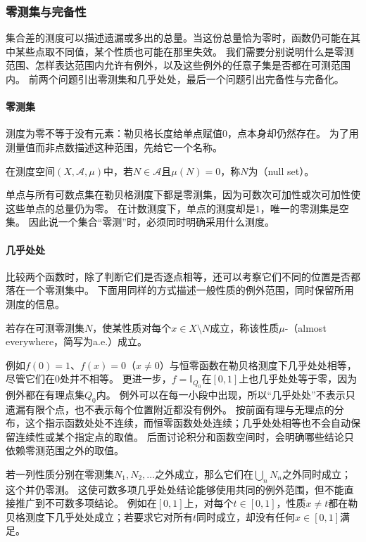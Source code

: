 \subsubsection{零测集与完备性}
\label{sec:comb-null-sets-and-completion}

集合差的测度可以描述遗漏或多出的总量。当这份总量恰为零时，函数仍可能在其中某些点取不同值，某个性质也可能在那里失效。
我们需要分别说明什么是零测范围、怎样表达范围内允许有例外，以及这些例外的任意子集是否都在可测范围内。
前两个问题引出零测集和几乎处处，最后一个问题引出完备性与完备化。

\paragraph{零测集}

测度为零不等于没有元素：勒贝格长度给单点赋值$0$，点本身却仍然存在。
为了用测量值而非点数描述这种范围，先给它一个名称。
\begin{definition}[零测集]
\label{def:analysis-null-set-almost-everywhere}
在测度空间$(X,\mathcal A,\mu)$中，若$N\in\mathcal A$且$\mu(N)=0$，称$N$为（null set）。
\end{definition}
单点与所有可数点集在勒贝格测度下都是零测集，因为可数次可加性或次可加性使这些单点的总量仍为零。
在计数测度下，单点的测度却是$1$，唯一的零测集是空集。
因此说一个集合“零测”时，必须同时明确采用什么测度。

\paragraph{几乎处处}

比较两个函数时，除了判断它们是否逐点相等，还可以考察它们不同的位置是否都落在一个零测集中。
下面用同样的方式描述一般性质的例外范围，同时保留所用测度的信息。
\begin{definition}[几乎处处]
若存在可测零测集$N$，使某性质对每个$x\in X\setminus N$成立，称该性质$\mu$-（almost everywhere，简写为a.e.）成立。
\end{definition}
例如$f(0)=1$、$f(x)=0$（$x\neq0$）与恒零函数在勒贝格测度下几乎处处相等，尽管它们在$0$处并不相等。
更进一步，$f=\mathbb I_{Q_0}$在$[0,1]$上也几乎处处等于零，因为例外都在有理点集$Q_0$内。
例外可以在每一小段中出现，所以“几乎处处”不表示只遗漏有限个点，也不表示每个位置附近都没有例外。
按前面有理与无理点的分布，这个指示函数处处不连续，而恒零函数处处连续；几乎处处相等也不会自动保留连续性或某个指定点的取值。
后面讨论积分和函数空间时，会明确哪些结论只依赖零测范围之外的取值。

若一列性质分别在零测集$N_1,N_2,\ldots$之外成立，那么它们在$\bigcup_nN_n$之外同时成立；这个并仍零测。
这使可数多项几乎处处结论能够使用共同的例外范围，但不能直接推广到不可数多项结论。
例如在$[0,1]$上，对每个$t\in[0,1]$，性质$x\neq t$都在勒贝格测度下几乎处处成立；若要求它对所有$t$同时成立，却没有任何$x\in[0,1]$满足。

